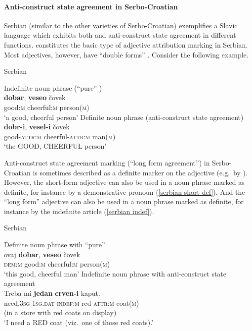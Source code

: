 \paragraph*{Anti\hyp{}construct state agreement in Serbo-Croatian} \label{serbian synchr}
Serbian (similar to the other varieties of Serbo-Croatian) exemplifies a Slavic language which exhibits both  and anti\hyp{}construct state agreement in different functions.  constitutes the basic type of adjective attribution marking in Serbian. Most adjectives, however, have “double forms” \cite[179–180]{kramsky1972}. Consider the following example.
\begin{exe}
\ex \rm{Serbian \citep[59]{zlatic1997}}
\begin{xlist}
\ex \rm{Indefinite noun phrase (“pure” )}\\
\gll	\textbf{dobar}, \textbf{veseo} čovek\\
	good:\textsc{m} cheerful:\textsc{m} person(\textsc{m})\\
\glt	‘a good, cheerful person’
\ex \rm{Definite noun phrase (anti\hyp{}construct state agreement)}\\
\gll	\textbf{dobr-i}, \textbf{vesel-i} čovek\\
	good-\textsc{attr:m} cheerful-\textsc{attr:m} man(\textsc{m})\\
\glt	‘the GOOD, CHEERFUL person’
\end{xlist}
\end{exe}
Anti\hyp{}construct state agreement marking (“long form agreement”) in Serbo\hyp{}Croatian is sometimes described as a definite marker on the adjective (e.g.~by \citealt[18–19]{kordic1997}). However, the short-form adjective can also be used in a noun phrase marked as definite, for instance by a demonstrative pronoun (\ref{serbian short-def}). And the “long form” adjective can also be used in a noun phrase marked as definite, for instance by the indefinite article (\ref{serbian indef}). 
\begin{exe}
\ex \rm{Serbian \citep{marusic-etal2007}}
\begin{xlist}
\label{serbian short-def} 
\ex \rm{Definite noun phrase with “pure” }\\
\gll	ovaj \textbf{dobar}, \textbf{veseo} \v{c}ovek\\
	\textsc{dem:m} good:\textsc{m} cheerful:\textsc{m} person(\textsc{m})\\
\glt	‘this good, cheerful man’
\label{serbian indef}
\ex \rm{Indefinite noun phrase with anti\hyp{}construct state agreement}\\
\gll	Treba mi \textbf{jedan} \textbf{crven-i} kaput.\\
	need.\textsc{3sg} \textsc{1sg.dat} \textsc{indef:m} red-\textsc{attr:m} coat(\textsc{m})\\
\glt (in a store with red coats on display)\\‘I need a RED coat (viz.~one of those red coats).’
\end{xlist}
\end{exe}
